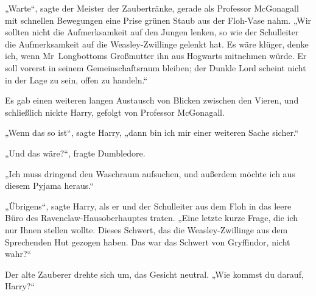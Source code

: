 „Warte“, sagte der Meister der Zaubertränke, gerade als Professor McGonagall mit schnellen Bewegungen eine Prise grünen Staub aus der Floh-Vase nahm.
„Wir sollten nicht die Aufmerksamkeit auf den Jungen lenken, so wie der Schulleiter die Aufmerksamkeit auf die Weasley-Zwillinge gelenkt hat. Es wäre klüger, denke ich, wenn Mr~Longbottoms Großmutter ihn aus Hogwarts mitnehmen würde. Er soll vorerst in seinem Gemeinschaftsraum bleiben; der Dunkle Lord scheint nicht in der Lage zu sein, offen zu handeln.“

Es gab einen weiteren langen Austausch von Blicken zwischen den Vieren, und schließlich nickte Harry, gefolgt von Professor McGonagall.

„Wenn das so ist“, sagte Harry, „dann bin ich mir einer weiteren Sache sicher.“

„Und das wäre?“, fragte Dumbledore.

„Ich muss dringend den Waschraum aufsuchen, und außerdem möchte ich aus diesem Pyjama heraus.“

\later

„Übrigens“, sagte Harry, als er und der Schulleiter aus dem Floh in das leere Büro des Ravenclaw-Hausoberhauptes traten.
„Eine letzte kurze Frage, die ich nur Ihnen stellen wollte. Dieses Schwert, das die Weasley-Zwillinge aus dem Sprechenden Hut gezogen haben. Das war das Schwert von Gryffindor, nicht wahr?“

Der alte Zauberer drehte sich um, das Gesicht neutral.
„Wie kommst du darauf, Harry?“

